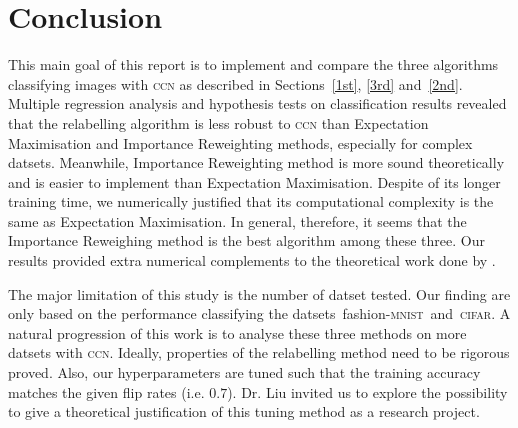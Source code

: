 \documentclass[12pt]{article} %
\newcommand{\rhoo}{\rho_{+1}}
\newcommand{\rhoz}{\rho_{-1}}
\newcommand{\mnist}{fashion-\textsc{mnist}}
\begin{document}




\section{Conclusion}
This main goal of this report is to implement and compare the three algorithms classifying images with \textsc{ccn} as described in Sections~\ref{1st}, \ref{3rd} and~\ref{2nd}. 
Multiple regression analysis and hypothesis tests on classification results revealed that the relabelling algorithm is less robust to \textsc{ccn} than Expectation Maximisation and Importance Reweighting methods, especially for complex datsets. Meanwhile, Importance Reweighting method is more sound theoretically \citep{liu2016classification} and is easier to implement than Expectation Maximisation. 
Despite of its longer training time, we numerically justified that its computational complexity is the same as Expectation Maximisation.
In general, therefore, it seems that the Importance Reweighing method is the best algorithm among these three. 
Our results provided extra numerical complements to the theoretical work done by \citet{liu2016classification}. 

The major limitation of this study is the number of datset tested. Our finding are only based on the performance classifying the datsets~\mnist\ and~\textsc{cifar}. A natural progression of this work is to analyse these three methods on more datsets with \textsc{ccn}. Ideally, properties of the relabelling method need to be rigorous proved. Also, our hyperparameters are tuned such that the training accuracy matches the given flip rates (i.e. $0.7$). Dr. Liu invited us to explore the possibility to give a theoretical justification of this tuning method as a research project.
\label{headings}



\end{document}
